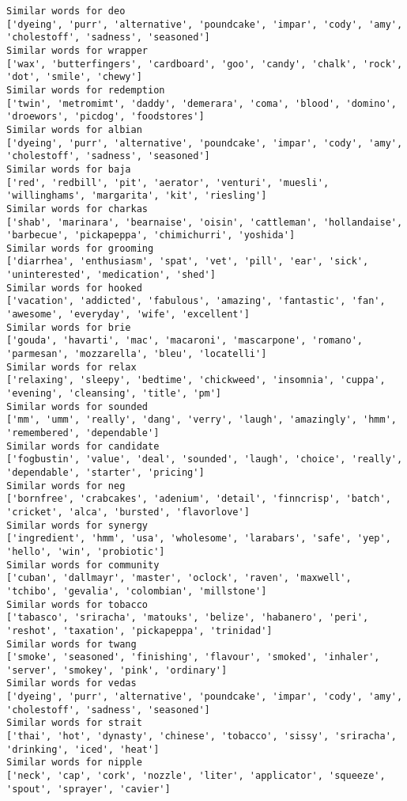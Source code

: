 \documentclass[11pt]{article}
\begin{document}
\begin{Verbatim}[commandchars=\\\{\}]
Similar words for deo
['dyeing', 'purr', 'alternative', 'poundcake', 'impar', 'cody', 'amy', 'cholestoff', 'sadness', 'seasoned']
Similar words for wrapper
['wax', 'butterfingers', 'cardboard', 'goo', 'candy', 'chalk', 'rock', 'dot', 'smile', 'chewy']
Similar words for redemption
['twin', 'metromimt', 'daddy', 'demerara', 'coma', 'blood', 'domino', 'droewors', 'picdog', 'foodstores']
Similar words for albian
['dyeing', 'purr', 'alternative', 'poundcake', 'impar', 'cody', 'amy', 'cholestoff', 'sadness', 'seasoned']
Similar words for baja
['red', 'redbill', 'pit', 'aerator', 'venturi', 'muesli', 'willinghams', 'margarita', 'kit', 'riesling']
Similar words for charkas
['shab', 'marinara', 'bearnaise', 'oisin', 'cattleman', 'hollandaise', 'barbecue', 'pickapeppa', 'chimichurri', 'yoshida']
Similar words for grooming
['diarrhea', 'enthusiasm', 'spat', 'vet', 'pill', 'ear', 'sick', 'uninterested', 'medication', 'shed']
Similar words for hooked
['vacation', 'addicted', 'fabulous', 'amazing', 'fantastic', 'fan', 'awesome', 'everyday', 'wife', 'excellent']
Similar words for brie
['gouda', 'havarti', 'mac', 'macaroni', 'mascarpone', 'romano', 'parmesan', 'mozzarella', 'bleu', 'locatelli']
Similar words for relax
['relaxing', 'sleepy', 'bedtime', 'chickweed', 'insomnia', 'cuppa', 'evening', 'cleansing', 'title', 'pm']
Similar words for sounded
['mm', 'umm', 'really', 'dang', 'verry', 'laugh', 'amazingly', 'hmm', 'remembered', 'dependable']
Similar words for candidate
['fogbustin', 'value', 'deal', 'sounded', 'laugh', 'choice', 'really', 'dependable', 'starter', 'pricing']
Similar words for neg
['bornfree', 'crabcakes', 'adenium', 'detail', 'finncrisp', 'batch', 'cricket', 'alca', 'bursted', 'flavorlove']
Similar words for synergy
['ingredient', 'hmm', 'usa', 'wholesome', 'larabars', 'safe', 'yep', 'hello', 'win', 'probiotic']
Similar words for community
['cuban', 'dallmayr', 'master', 'oclock', 'raven', 'maxwell', 'tchibo', 'gevalia', 'colombian', 'millstone']
Similar words for tobacco
['tabasco', 'sriracha', 'matouks', 'belize', 'habanero', 'peri', 'reshot', 'taxation', 'pickapeppa', 'trinidad']
Similar words for twang
['smoke', 'seasoned', 'finishing', 'flavour', 'smoked', 'inhaler', 'server', 'smokey', 'pink', 'ordinary']
Similar words for vedas
['dyeing', 'purr', 'alternative', 'poundcake', 'impar', 'cody', 'amy', 'cholestoff', 'sadness', 'seasoned']
Similar words for strait
['thai', 'hot', 'dynasty', 'chinese', 'tobacco', 'sissy', 'sriracha', 'drinking', 'iced', 'heat']
Similar words for nipple
['neck', 'cap', 'cork', 'nozzle', 'liter', 'applicator', 'squeeze', 'spout', 'sprayer', 'cavier']

\end{Verbatim}
\end{document}
